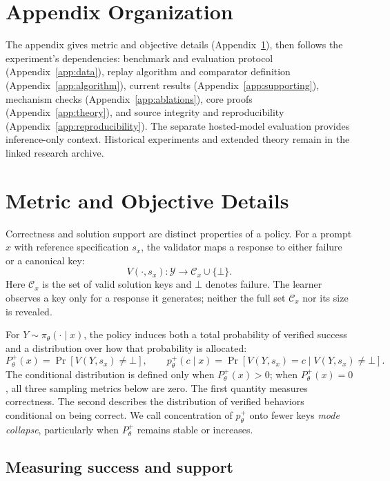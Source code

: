 \documentclass{article}
\newcommand{\1}{\mathbf 1}
\theoremstyle{remark}
\theoremstyle{definition}
\theoremstyle{plain}
\begin{document}
\section*{Appendix Organization}
\label{app:organization}
The appendix gives metric and objective details (Appendix~\ref{app:metric-details}),
then follows the experiment's dependencies: benchmark and evaluation
protocol (Appendix~\ref{app:data}), replay algorithm and comparator definition
(Appendix~\ref{app:algorithm}), current results
(Appendix~\ref{app:supporting}), mechanism checks
(Appendix~\ref{app:ablations}), core proofs
(Appendix~\ref{app:theory}), and source integrity and reproducibility
(Appendix~\ref{app:reproducibility}). The separate hosted-model evaluation
provides inference-only context. Historical experiments and extended theory
remain in the linked research archive.

\appendix
\onecolumn
\raggedbottom

\section{Metric and Objective Details}
\label{app:metric-details}

Correctness and solution support are distinct properties of a policy. For a
prompt $x$ with reference specification $s_x$, the validator maps a response
to either failure or a canonical key:
\[
  V(\cdot,s_x):\mathcal Y\rightarrow \mathcal C_x\cup\{\bot\}.
\]
Here $\mathcal C_x$ is the set of valid solution keys and $\bot$ denotes
failure. The learner observes a key only for a response it generates; neither
the full set $\mathcal C_x$ nor its size is revealed.

For $Y\sim\pi_\theta(\cdot\mid x)$, the policy induces both a total probability
of verified success and a distribution over how that probability is allocated:
\[
 P_\theta^+(x)=\Pr[V(Y,s_x)\neq\bot],
 \qquad
 p_\theta^+(c\mid x)=\Pr[V(Y,s_x)=c\mid V(Y,s_x)\neq\bot].
\]
The conditional distribution is defined only when $P_\theta^+(x)>0$;
when $P_\theta^+(x)=0$, all three sampling metrics below are zero.
The first quantity measures correctness. The second describes the distribution
of verified behaviors conditional on being correct. We call concentration of
$p_\theta^+$ onto fewer keys \emph{mode collapse}, particularly when
$P_\theta^+$ remains stable or increases.

\subsection{Measuring success and support}
\label{app:metric-sampling}
\end{document}
